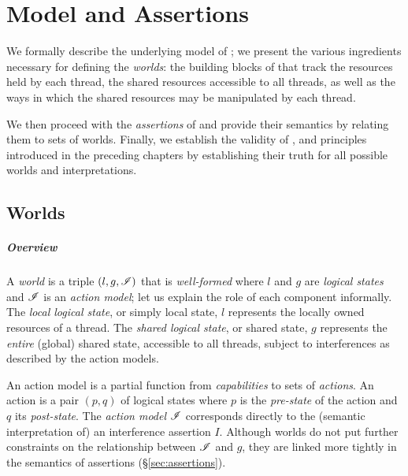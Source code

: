 \chapter{\colosl Model and Assertions}\label{chapter:logic}
We formally describe the underlying model of \colosl; we present the various ingredients necessary for defining the \colosl \emph{worlds}: the building blocks of \colosl that track the resources held by each thread, the shared resources accessible to all threads, as well as the ways in which the shared resources may be manipulated by each thread.

We then proceed with the \emph{assertions} of \colosl and provide their semantics by relating them to sets of worlds. Finally, we establish the validity of \copyRule, \forgetRule and \mergeRule principles introduced in the preceding chapters by establishing their truth for all possible worlds and interpretations.

\section{Worlds}
\paragraph{Overview}
A \emph{world} is a triple $(l, g, \mathscr{I})$ that is \emph{well-formed} where $l$ and $g$ are \emph{logical states} and $\mathscr{I}$ is an \emph{action model}; let us explain the role of each component informally. The \emph{local logical state}, or simply local state, $l$ represents the locally owned resources of a thread. The \emph{shared logical state}, or shared state, $g$ represents the \emph{entire} (global) shared state, accessible to all threads, subject to interferences as described by the action models.

An action model is a partial function from \emph{capabilities} to sets of \emph{actions}. An action is a pair $(p,q)$ of logical states where $p$ is the \emph{pre-state} of the action and $q$ its \emph{post-state}.  The \emph{action model} $\mathscr{I}$ corresponds directly to the (semantic interpretation of) an interference assertion $I$. Although worlds do not put further constraints on the
relationship between $\mathscr{I}$ and $g$, they are linked more tightly in the semantics of assertions (\S\ref{sec:assertions}).

